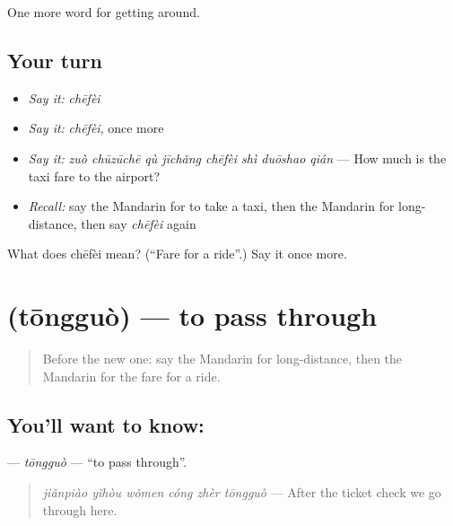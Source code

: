 \begin{grammarlens}[title={What you've built}]
One more word for getting around.
\end{grammarlens}

\subsection*{Your turn}
\begin{itemize}
\raggedright
  \item \emph{Say it:} \emph{chēfèi}
  \item \emph{Say it:} \emph{chēfèi}, once more
  \item \emph{Say it:} \emph{zuò chūzūchē qù jīchǎng chēfèi shì duōshao qián} — How much is the taxi fare to the airport?
  \item \emph{Recall:} say the Mandarin for to take a taxi, then the Mandarin for long-distance, then say \emph{chēfèi} again
\end{itemize}

\begin{tcolorbox}[breakable,colback=teal!4,colframe=teal!35!black,title={Before you move on}]
What does chēfèi mean? (\textquotedblleft{}Fare for a ride\textquotedblright{}.) Say it once more.
\end{tcolorbox}
\section[\texorpdfstring{\zh{通过} (tōngguò)}{通过 (tōngguò)}]{ (tōngguò) — to pass through}

\label{lesson:ZH-C410-tongguo}



\begin{quote}
Before the new one: say the Mandarin for long-distance, then the Mandarin for the fare for a ride.
\end{quote}

\subsection*{You'll want to know: }
\textbf{} — \emph{tōngguò} — \textquotedblleft{}to pass through\textquotedblright{}.

\begin{quote}
\textbf{} \emph{jiǎnpiào yǐhòu wǒmen cóng zhèr tōngguò} — After the ticket check we go through here.
\end{quote}


